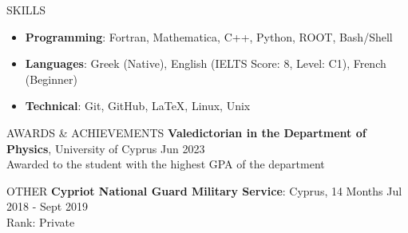 \documentclass{resume} %
\begin{document}
        \bigbreak

        \begin{rSection}{SKILLS}
                \begin{itemize}
                        \itemsep -3pt {} 
                        \item \textbf{Programming}: Fortran, Mathematica, C++, Python, ROOT, Bash/Shell
                        \item \textbf{Languages}: Greek (Native), English (IELTS Score: 8, Level: C1), French (Beginner)
                        \item \textbf{Technical}: Git, GitHub, \LaTeX, Linux, Unix
                \end{itemize}
        \end{rSection}

        \bigbreak

        \begin{rSection}{AWARDS \& ACHIEVEMENTS}
                {\bf Valedictorian in the Department of Physics}, University of Cyprus \hfill Jun 2023\\
                Awarded to the student with the highest GPA of the department
                
                
        \end{rSection} 

        \bigbreak

        \begin{rSection}{OTHER}
                {\bf Cypriot National Guard Military Service}: Cyprus, 14 Months \hfill {Jul 2018 - Sept 2019}\\
                Rank: Private
        \end{rSection}

        \bigbreak

\end{document}
